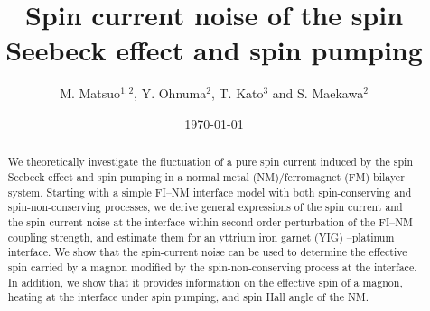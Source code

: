 \documentclass[aps,prl,reprint,showpacs]{revtex4-1}
\begin{document}

\title{Spin current noise of the spin Seebeck effect and spin pumping}


\author{M. Matsuo$^{1,2}$, Y. Ohnuma$^{2}$, T. Kato$^{3}$ and S. Maekawa$^{2}$}
%

\date{\today}

\begin{abstract}
We theoretically investigate the fluctuation of a pure spin current induced by the spin Seebeck effect and spin pumping 
in a normal metal (NM)/ferromagnet (FM) bilayer system.
Starting with  a simple FI--NM interface model with both spin-conserving and spin-non-conserving processes, 
we derive general expressions of the spin current and the spin-current noise at the interface within second-order perturbation of
the FI--NM coupling strength, and estimate them for an  yttrium iron garnet (YIG) --platinum interface.
We show that the spin-current noise can be used to determine the effective spin 
carried by a magnon
modified by the spin-non-conserving process at the interface. 
In addition, we show that it provides information on the effective spin of a magnon, heating at the interface under spin pumping, and spin Hall angle of the NM.
\end{abstract}


\maketitle %
\end{document}
